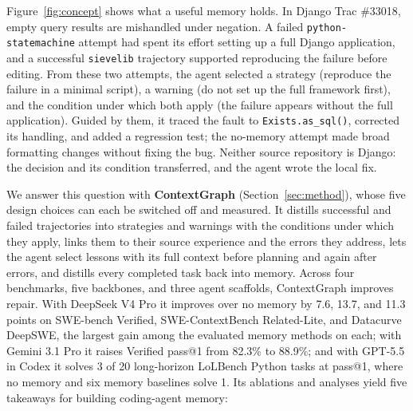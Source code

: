\documentclass{article}
\begin{document}
Figure~\ref{fig:concept} shows what a useful memory holds. In Django Trac
\#33018, empty query results are mishandled under negation. A failed
\texttt{python-statemachine} attempt had spent its effort setting up a full
Django application, and a successful \texttt{sievelib} trajectory supported
reproducing the failure before editing. From these two attempts, the agent selected a
strategy (reproduce the failure in a minimal script), a warning (do not set
up the full framework first), and the condition under which both apply (the
failure appears without the full application). Guided by them, it traced the
fault to \texttt{Exists.as\_sql()}, corrected its handling, and added a
regression test; the no-memory attempt made broad formatting changes without
fixing the bug. Neither source repository is Django: the decision and its
condition transferred, and the agent wrote the local fix.

We answer this question with \textbf{ContextGraph}
(Section~\ref{sec:method}), whose five design choices can each be switched
off and measured. It distills
successful and failed trajectories into strategies and warnings with the
conditions under which they apply, links them to their source experience and
the errors they address, lets the agent select lessons with its full context
before planning and again after errors, and distills every completed task
back into memory. Across four benchmarks, five backbones, and three agent
scaffolds, ContextGraph improves repair. With DeepSeek V4 Pro it improves over
no memory by 7.6, 13.7, and 11.3 points on SWE-bench Verified,
SWE-ContextBench Related-Lite, and Datacurve DeepSWE, the largest gain among
the evaluated memory methods on each; with Gemini 3.1 Pro it raises Verified
pass@1 from 82.3\% to 88.9\%; and with GPT-5.5 in Codex it solves 3 of 20
long-horizon LoLBench Python tasks at pass@1, where no memory and six memory
baselines solve 1. Its ablations and analyses yield five takeaways for
building coding-agent memory:
\end{document}
